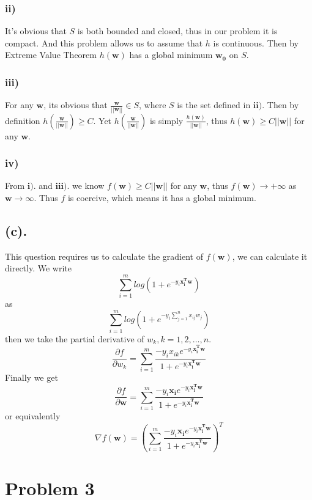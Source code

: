 \documentclass[12pt,letterpaper]{article}
\begin{document}
\subsubsection*{ii)}
It's obvious that $S$ is both bounded and closed, thus in our problem it is compact. And this problem allows us to assume that $h$ is continuous. Then by Extreme Value Theorem $h(\boldsymbol{w})$ has a global minimum $\boldsymbol{w_{0}}$ on $S$. 
\subsubsection*{iii)}
For any $\boldsymbol{w}$, its obvious that $\frac{\boldsymbol{w}}{||\boldsymbol{w}||}\in S$, where $S$ is the set defined in $\boldsymbol{ii).}$ Then by definition $h(\frac{\boldsymbol{w}}{||\boldsymbol{w}||})\geq C$. Yet $h(\frac{\boldsymbol{w}}{||\boldsymbol{w}||})$ is simply $\frac{h(\boldsymbol{w})}{||\boldsymbol{w}||}$, thus $h(\boldsymbol{w})\geq C||\boldsymbol{w}||$ for any $\boldsymbol{w}$.
\subsubsection*{iv)}
From $\boldsymbol{i).}$ and $\boldsymbol{iii).}$ we know $f(\boldsymbol{w})\geq C||\boldsymbol{w}||$ for any $\boldsymbol{w}$, thus $f(\boldsymbol{w})\to +\infty$ as $\boldsymbol{w}\to \infty$. Thus $f$ is coercive, which means it has a global minimum.
\subsection*{(c).}
This question requires us to calculate the gradient of $f(\boldsymbol{w})$, we can calculate it directly. We write $$\sum_{i=1}^{m}log(1+e^{-y_i\boldsymbol{x_{i}^{T}w}})$$ as $$\sum_{i=1}^{m}log(1+e^{-y_i\sum_{j=1}^{n}x_{ij}w_{j}})$$then we take the partial derivative of $w_k, k=1,2,\dots, n$. $$\frac{\partial f}{\partial w_k}=\sum_{i=1}^{m}\frac{-y_ix_{ik}e^{-y_i\boldsymbol{x_{i}^{T}w}}}{1+e^{-y_i\boldsymbol{x_{i}^{T}w}}}$$
Finally we get 
$$\frac{\partial f}{\partial \boldsymbol{w}}=\sum_{i=1}^{m}\frac{-y_i\boldsymbol{x_{i}}e^{-y_i\boldsymbol{x_{i}^{T}w}}}{1+e^{-y_i\boldsymbol{x_{i}^{T}w}}}$$
or equivalently 
$$\nabla f(\boldsymbol{w})=(\sum_{i=1}^{m}\frac{-y_i\boldsymbol{x_{i}}e^{-y_i\boldsymbol{x_{i}^{T}w}}}{1+e^{-y_i\boldsymbol{x_{i}^{T}w}}})^{T}$$

\section*{Problem 3}
\end{document}
